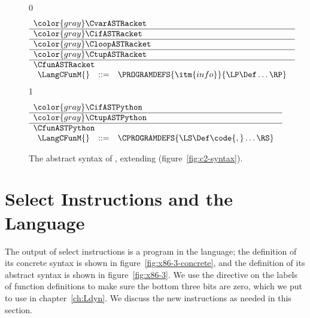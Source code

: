 \documentclass[7x10]{TimesAPriori_MIT}%
\newcommand{\gray}[1]{{\color{gray} #1}}
\def\racketEd{0}
\def\pythonEd{1}
\def\edition{1}
\newcommand{\pythonColor}[0]{}
\numberwithin{theorem}{chapter}
\numberwithin{definition}{chapter}
\numberwithin{equation}{chapter}
\begin{document}
\begin{figure}[tp]
  \begin{tcolorbox}[colback=white]
\footnotesize
{\if\edition\racketEd
\[
\begin{array}{l}
  \gray{\CvarASTRacket} \\ \hline
  \gray{\CifASTRacket} \\ \hline
  \gray{\CloopASTRacket} \\ \hline
  \gray{\CtupASTRacket} \\ \hline
  \CfunASTRacket \\
  \begin{array}{lcl}
  \LangCFunM{} & ::= & \PROGRAMDEFS{\itm{info}}{\LP\Def\ldots\RP} 
  \end{array}
\end{array}
\]
\fi}
{\if\edition\pythonEd\pythonColor
\[
  \begin{array}{l}
  \gray{\CifASTPython} \\ \hline
  \gray{\CtupASTPython} \\ \hline
  \CfunASTPython \\
  \begin{array}{lcl}
    \LangCFunM{} & ::= & \CPROGRAMDEFS{\LS\Def\code{,}\ldots\RS} 
  \end{array}
  \end{array}
\]
\fi}
  \end{tcolorbox}

\caption{The abstract syntax of \LangCFun{}, extending \LangCVec{} (figure~\ref{fig:c2-syntax}).}
\label{fig:c3-syntax}
\end{figure}

\clearpage

\section{Select Instructions and the \LangXIndCall{} Language}
\label{sec:select-r4}

The output of select instructions is a program in the \LangXIndCall{}
language; the definition of its concrete syntax is shown in
figure~\ref{fig:x86-3-concrete}, and the definition of its abstract
syntax is shown in figure~\ref{fig:x86-3}.  We use the 
directive on the labels of function definitions to make sure the
bottom three bits are zero, which we put to use in
chapter~\ref{ch:Ldyn}. We discuss the new instructions as needed in
this section.  
\end{document}
